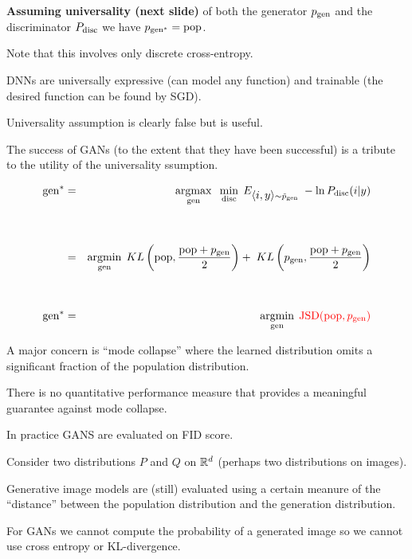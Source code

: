 {\vfill
{\bf Assuming universality (next slide)} of both the generator $p_{\mathrm{gen}}$ and the discriminator $P_{\mathrm{disc}}$ we have {\color{red} $p_{\mathrm{gen}^*} = \mathrm{pop}$}.

\vfill
Note that this involves only discrete cross-entropy.



DNNs are universally expressive (can model any function) and trainable (the desired function can be found by SGD).

\vfill
Universality assumption is clearly false but is useful.

\vfill
The success of GANs (to the extent that they have been successful) is a tribute to the utility of the universality ssumption.



{\huge
\begin{eqnarray*}
  \mathrm{gen}^* & = & \operatorname*{argmax}_{\mathrm{gen}}\;\;\min_{\mathrm{disc}}\;E_{{\mbox{$\langle i,y\rangle$}} \sim \tilde{p}_{\mathrm{gen}}}\;-\ln P_{\mathrm{disc}}(i|y) \\
  \\
  \\
  & = & \operatorname*{argmin}_{\mathrm{gen}} \; KL\left(\mathrm{pop},\frac{\mathrm{pop}+p_{\mathrm{gen}}}{2}\right)+\;KL\left(p_{\mathrm{gen}},\frac{\mathrm{pop}+p_{\mathrm{gen}}}{2}\right) \\
  \\
  \\
  \mathrm{gen}^* & = & \operatorname*{argmin}_{\mathrm{gen}} \; {\color{red} \mathrm{JSD}(\mathrm{pop},p_{\mathrm{gen}})}
\end{eqnarray*}
}



A major concern is ``mode collapse'' where the learned distribution omits a significant fraction of the population distribution.

\vfill
There is no quantitative performance measure that provides a meaningful guarantee against mode collapse.

\vfill
In practice GANS are evaluated on FID score.


Consider two distributions $P$ and $Q$ on $\mathbb{R}^d$ (perhaps two distributions on images).

\vfill
Generative image models are (still) evaluated using a certain meanure of the ``distance'' between the population distribution
and the generation distribution.

\vfill
For GANs we cannot compute the probability of a generated image so we cannot use cross entropy or KL-divergence.

}
